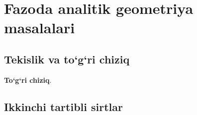 \chapter{Fazoda analitik geometriya masalalari}
\section{Tekislik va to`g`ri chiziq}
\textbf{To`g`ri chiziq}.
\section{Ikkinchi tartibli sirtlar}
